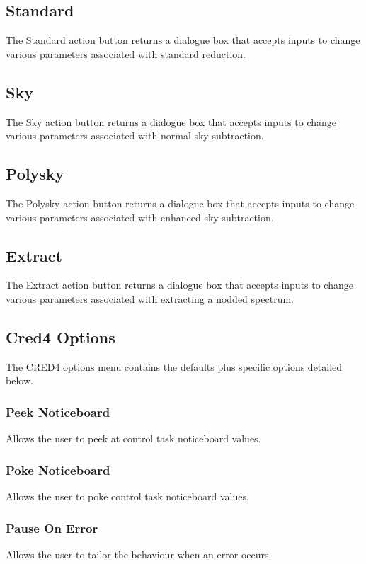 \documentclass[a4paper]{book}
\renewcommand{\_}{{\tt\char'137}}
\begin{document}
\subsection{Standard}
The {\sf Standard} action button returns a dialogue box that
accepts inputs to change various parameters associated with {\sc standard} reduction.

\subsection{Sky}
The {\sf Sky} action button returns a dialogue box that
accepts inputs to change various parameters associated with normal sky subtraction.

\subsection{Polysky}
The {\sf Polysky} action button returns a dialogue box that
accepts inputs to change various parameters associated with enhanced sky subtraction.

\subsection{Extract}
The {\sf Extract} action button returns a dialogue box that
accepts inputs to change various parameters associated with extracting a nodded spectrum.

\subsection{Cred4 Options}
The CRED4 options menu contains the defaults plus specific options detailed below.

\subsubsection{Peek Noticeboard}
Allows the user to peek at control task noticeboard values.

\subsubsection{Poke Noticeboard}
Allows the user to poke control task noticeboard values.

\subsubsection{Pause On Error}
Allows the user to tailor the behaviour when an error occurs.
\end{document}
